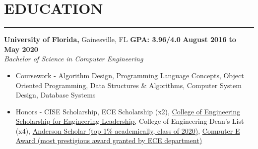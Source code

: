\section*{EDUCATION}

\hrule \relax
\sectionheaderspace

\noindent \textbf{University of Florida,} Gainesville, FL
\hfill\textbf{GPA: 3.96/4.0}
\hfill\textbf{August 2016 to May 2020}\\
\textit{Bachelor of Science in Computer Engineering}
\begin{itemize}[noitemsep,nolistsep, label = {-}]
	\item  Coursework - 
									Algorithm Design,
									Programming Language Concepts,
									Object Oriented Programming,
									Data Structures \& Algorithms,
									Computer System Design,
									Database Systems
	\item  Honors - 
									CISE Scholarship,
									ECE Scholarship (x2),
									\href{https://www.eng.ufl.edu/leadership/students/scholarships/thomas-o-hunter-leadership/}
											{College of Engineering Scholarship for Engineering Leadership},
									College of Engineering Dean\rq s List (x4),
									\href{https://sites.clas.ufl.edu/clas-main/undergraduate/anderson-scholars/anderson-scholars-listing/}
											{Anderson Scholar (top 1\% academically, class of 2020)},
									\href{https://www.ece.ufl.edu/people/student-awards/}
											{Computer E Award (most prestigious award granted by ECE department)}
\end{itemize}
\subsectionspace